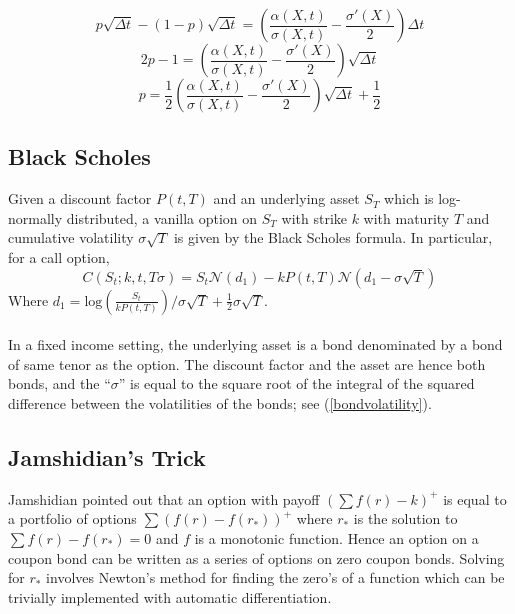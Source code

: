 \documentclass{article}
\theoremstyle{definition}
\begin{document}
 \[p\sqrt{\Delta t}-(1-p)\sqrt{\Delta t}=\left(\frac{\alpha(X, t)}{\sigma(X, t)}-\frac{\sigma'(X)}{2}\right)\Delta t\]
  \[2p-1=\left(\frac{\alpha(X, t)}{\sigma(X, t)}-\frac{\sigma'(X)}{2}\right)\sqrt{\Delta t}\]
  \[p=\frac{1}{2}\left(\frac{\alpha(X, t)}{\sigma(X, t)}-\frac{\sigma'(X)}{2}\right)\sqrt{\Delta t}+\frac{1}{2}\]
  
\subsection{Black Scholes} \label{BS}
  Given a discount factor \(P(t, T)\) and an underlying asset \(S_T\) which is log-normally distributed, a vanilla option on \(S_T\) with strike \(k\) with maturity \(T\) and cumulative volatility \(\sigma \sqrt{T}\) is given by the Black Scholes formula.  In particular, for a call option,
  \[C(S_t; k, t, T \sigma)=S_t \mathcal{N}(d_1)-kP(t, T)\mathcal{N}(d_1-\sigma \sqrt{T})\]
  Where \(d_1=\mathrm{log}\left(\frac{S_t}{kP(t, T)}\right)/\sigma \sqrt{T}+\frac{1}{2}\sigma \sqrt{T}\).
  \\
  \\
  In a fixed income setting, the underlying asset is a bond denominated by a bond of same tenor as the option.  The discount factor and the asset are hence both bonds, and the ``\(\sigma\)'' is equal to the square root of the integral of the squared difference between the volatilities of the bonds; see (\ref{bondvolatility}). 
  
  
\subsection{Jamshidian's Trick} \label{Jamshidian}

Jamshidian pointed out that an option with payoff \(\left(\sum f(r) -k\right)^+\) is equal to a portfolio of options \(\sum (f(r)-f(r_*))^+\) where \(r_*\) is the solution to \(\sum f(r)-f(r_*)=0\) and \(f\) is a monotonic function. Hence an option on a coupon bond can be written as a series of options on zero coupon bonds.   Solving for \(r_*\) involves Newton's method for finding the zero's of a function which can be trivially implemented with automatic differentiation.  
\end{document}
